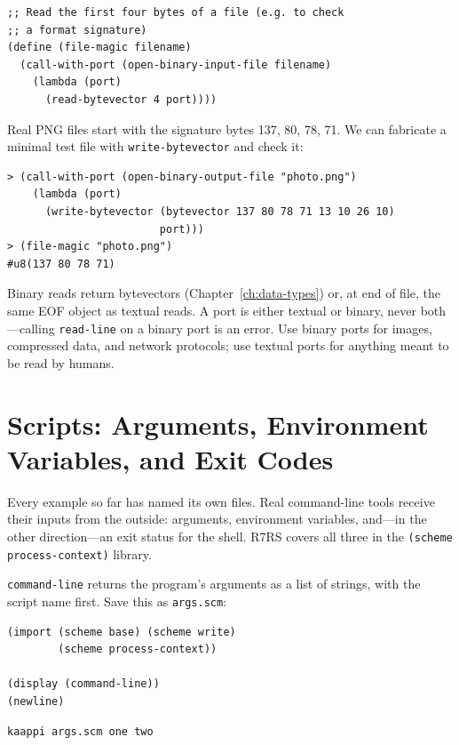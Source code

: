 \begin{lstlisting}
;; Read the first four bytes of a file (e.g. to check
;; a format signature)
(define (file-magic filename)
  (call-with-port (open-binary-input-file filename)
    (lambda (port)
      (read-bytevector 4 port))))
\end{lstlisting}

Real PNG files start with the signature bytes 137, 80, 78, 71. We can fabricate a minimal test file with \texttt{write-bytevector} and check it:

\begin{lstlisting}[style=repl]
> (call-with-port (open-binary-output-file "photo.png")
    (lambda (port)
      (write-bytevector (bytevector 137 80 78 71 13 10 26 10)
                        port)))
> (file-magic "photo.png")
#u8(137 80 78 71)
\end{lstlisting}

Binary reads return bytevectors (Chapter~\ref{ch:data-types}) or, at end of file, the same EOF object as textual reads. A port is either textual or binary, never both---calling \texttt{read-line} on a binary port is an error. Use binary ports for images, compressed data, and network protocols; use textual ports for anything meant to be read by humans.

\section{Scripts: Arguments, Environment Variables, and Exit Codes}

Every example so far has named its own files. Real command-line tools receive their inputs from the outside: arguments, environment variables, and---in the other direction---an exit status for the shell. R7RS covers all three in the \texttt{(scheme process-context)} library.

\texttt{command-line} returns the program's arguments as a list of strings, with the script name first. Save this as \texttt{args.scm}:

\begin{lstlisting}
(import (scheme base) (scheme write)
        (scheme process-context))

(display (command-line))
(newline)
\end{lstlisting}

\begin{Verbatim}[fontsize=\small]
kaappi args.scm one two
\end{Verbatim}

